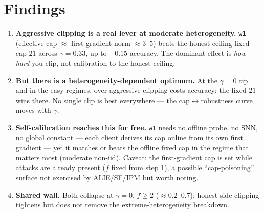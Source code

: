 \documentclass[11pt]{article}
\newcommand{\code}[1]{\texttt{#1}}
\begin{document}
\section{Findings}
\begin{enumerate}\itemsep3pt
  \item \textbf{Aggressive clipping is a real lever at moderate heterogeneity.} \code{w1}
    (effective cap $\approx$ first-gradient norm $\approx 3$--$5$) beats the honest-ceiling
    fixed cap $21$ across $\gamma{=}0.33$, up to $+0.15$ accuracy. The dominant effect is
    \emph{how hard} you clip, not calibration to the honest ceiling.
  \item \textbf{But there is a heterogeneity-dependent optimum.} At the $\gamma{=}0$ tip and
    in the easy regimes, over-aggressive clipping costs accuracy: the fixed $21$ wins there.
    No single clip is best everywhere --- the cap$\leftrightarrow$robustness curve moves with
    $\gamma$.
  \item \textbf{Self-calibration reaches this for free.} \code{w1} needs no offline probe, no
    SNN, no global constant --- each client derives its cap online from its own first gradient
    --- yet it matches or beats the offline fixed cap in the regime that matters most
    (moderate non-iid). Caveat: the first-gradient cap is set while attacks are already
    present ($f$ fixed from step 1), a possible ``cap-poisoning'' surface not exercised by
    ALIE/SF/IPM but worth noting.
  \item \textbf{Shared wall.} Both collapse at $\gamma{=}0$, $f\ge2$ ($\approx0.2$--$0.7$):
    honest-side clipping tightens but does not remove the extreme-heterogeneity breakdown.
\end{enumerate}
\end{document}
